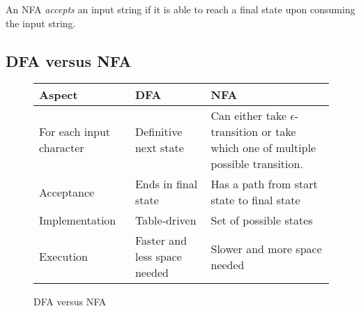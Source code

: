 \begin{definition}
    An NFA \textit{accepts} an input string if it is able to reach a final state upon consuming the input string.
\end{definition}

\subsection{DFA versus NFA}

\begin{figure}[H]
    \centering
    \begin{tabular}{@{} p{10em} p{10em} p{10em} @{}}
        \toprule
        Aspect & DFA & NFA \\
        \midrule
        For each input character 
        & Definitive next state 
        & Can either take $\epsilon$-transition or take which one of multiple possible transition. \\
        Acceptance
        & Ends in final state
        & Has a path from start state to final state \\
        Implementation 
        & Table-driven
        & Set of possible states \\
        Execution
        & Faster and less space needed
        & Slower and more space needed \\
        \bottomrule
    \end{tabular}
    \caption{DFA versus NFA}
    \label{fig:dfa-vs-nfa}
\end{figure}
